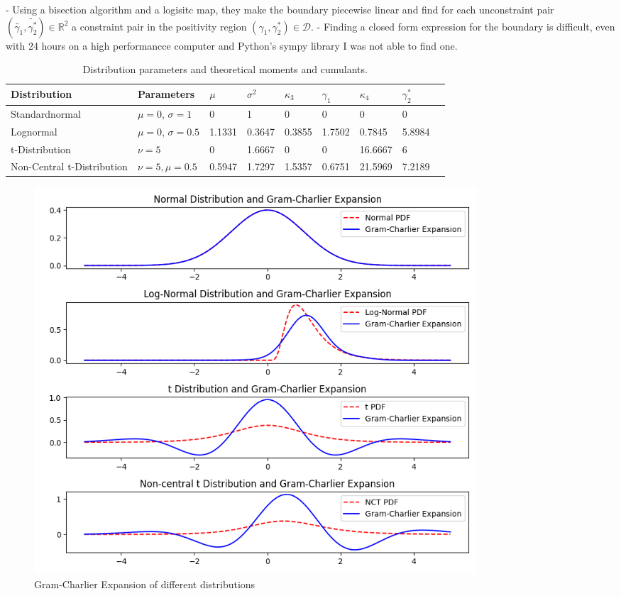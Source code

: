 - Using a bisection algorithm and a logisitc map, they make the boundary piecewise linear and find for each unconstraint pair $(\tilde{\gamma_1}, \tilde{\gamma_2^*})\in\mathbb{R}^2$ a constraint pair in the positivity region $(\gamma_1, \gamma_2^*)\in \mathcal{D}$.
- Finding a closed form expression for the boundary is difficult, even with 24 hours on a high performancce computer and Python's sympy library I was not able to find one.

\begin{table}[h]
    \centering
    \begin{tabular}{l|l|l|l|l|l|l|l|l}
        Distribution & Parameters & $\mu$ & $\sigma^2$ & $\kappa_3$ & $\gamma_1$ & $\kappa_4$ & $\gamma_2^*$ \\
        \hline
        Standardnormal & $\mu=0$, $\sigma=1$ & 0 & 1 & 0 & 0 & 0 & 0 \\
        Lognormal & $\mu=0$, $\sigma = 0.5$ & 1.1331 & 0.3647 & 0.3855 & 1.7502 & 0.7845 & 5.8984 \\
        t-Distribution & $\nu=5$ & 0 & 1.6667 & 0 & 0 & 16.6667 & 6 \\
        Non-Central t-Distribution & $\nu=5, \mu=0.5$ & 0.5947 & 1.7297 & 1.5357 & 0.6751 & 21.5969 & 7.2189
    \end{tabular}
    \caption{Distribution parameters and theoretical moments and cumulants.}
    \label{table:distributions_theoretical_moments}
\end{table}

\begin{figure}[h]
    \centering
    \includegraphics[width=0.8\textwidth]{img/gc_expansion.png}
    \caption{Gram-Charlier Expansion of different distributions}
    \label{fig:gc_expansion}
\end{figure}

